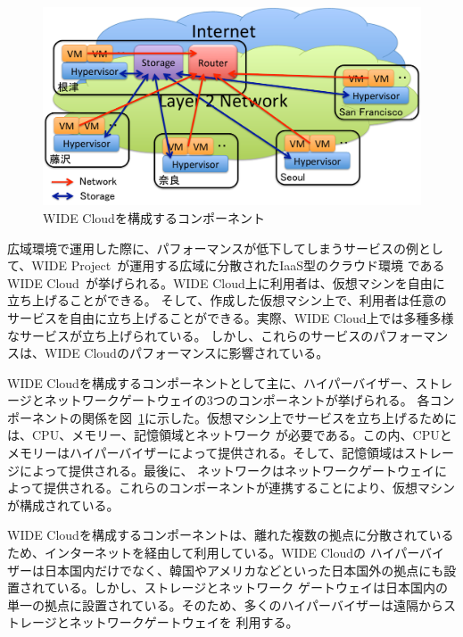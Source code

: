 \begin{figure}
	\begin{center}
		\includegraphics[scale=0.60]{./img/widecloud}
		\caption{WIDE Cloudを構成するコンポーネント}
		\label{img:widecloud}
	\end{center}
\end{figure}

広域環境で運用した際に、パフォーマンスが低下してしまうサービスの例として、WIDE Project~\cite{wideproject}が運用する広域に分散されたIaaS型のクラウド環境
であるWIDE Cloud~\cite{wcc}が挙げられる。WIDE Cloud上に利用者は、仮想マシンを自由に立ち上げることができる。
そして、作成した仮想マシン上で、利用者は任意のサービスを自由に立ち上げることができる。実際、WIDE Cloud上では多種多様なサービスが立ち上げられている。
しかし、これらのサービスのパフォーマンスは、WIDE Cloudのパフォーマンスに影響されている。

WIDE Cloudを構成するコンポーネントとして主に、ハイパーバイザー、ストレージとネットワークゲートウェイの3つのコンポーネントが挙げられる。
各コンポーネントの関係を図~\ref{img:widecloud}に示した。仮想マシン上でサービスを立ち上げるためには、CPU、メモリー、記憶領域とネットワーク
が必要である。この内、CPUとメモリーはハイパーバイザーによって提供される。そして、記憶領域はストレージによって提供される。最後に、
ネットワークはネットワークゲートウェイによって提供される。これらのコンポーネントが連携することにより、仮想マシンが構成されている。

WIDE Cloudを構成するコンポーネントは、離れた複数の拠点に分散されているため、インターネットを経由して利用している。WIDE Cloudの
ハイパーバイザーは日本国内だけでなく、韓国やアメリカなどといった日本国外の拠点にも設置されている。しかし、ストレージとネットワーク
ゲートウェイは日本国内の単一の拠点に設置されている。そのため、多くのハイパーバイザーは遠隔からストレージとネットワークゲートウェイを
利用する。

